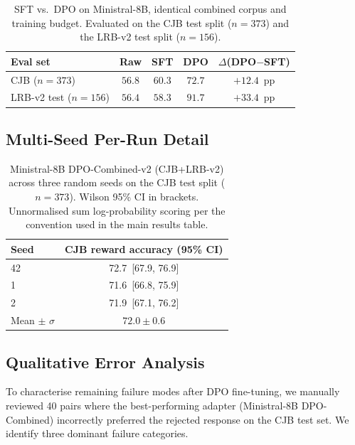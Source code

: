 \documentclass{article}
\theoremstyle{plain}
\theoremstyle{definition}
\theoremstyle{remark}
\begin{document}
\begin{table}[h]
\centering
\caption{SFT vs.\ DPO on Ministral-8B, identical combined corpus and training budget.  Evaluated on the CJB test split ($n=373$) and the LRB-v2 test split ($n=156$).}
\label{tab:sft-ablation}
\smallskip
\small
\setlength{\tabcolsep}{3pt}
\begin{tabular}{lcccc}
\toprule
\textbf{Eval set} & \textbf{Raw} & \textbf{SFT} & \textbf{DPO} & \textbf{$\Delta$(DPO$-$SFT)} \\
\midrule
CJB ($n=373$)           & $56.8$ & $60.3$ & $\mathbf{72.7}$ & $+12.4$~pp \\
LRB-v2 test ($n=156$)   & $56.4$ & $58.3$ & $\mathbf{91.7}$ & $+33.4$~pp \\
\bottomrule
\end{tabular}
\end{table}

\subsection{Multi-Seed Per-Run Detail}
\label{app:multiseed}

\begin{table}[h]
\centering
\caption{Ministral-8B DPO-Combined-v2 (CJB+LRB-v2) across three random seeds on the CJB test split ($n=373$).  Wilson 95\% CI in brackets.  Unnormalised sum log-probability scoring per the convention used in the main results table.}
\label{app:tab:multiseed}
\smallskip
\small
\setlength{\tabcolsep}{6pt}
\begin{tabular}{lc}
\toprule
\textbf{Seed} & \textbf{CJB reward accuracy (95\% CI)} \\
\midrule
42 & 72.7 \,[67.9, 76.9] \\
1  & 71.6 \,[66.8, 75.9] \\
2  & 71.9 \,[67.1, 76.2] \\
\midrule
Mean $\pm$ $\sigma$ & $\mathbf{72.0 \pm 0.6}$ \\
\bottomrule
\end{tabular}
\end{table}

\subsection{Qualitative Error Analysis}
\label{app:errors}

To characterise remaining failure modes after DPO fine-tuning, we manually reviewed 40 pairs where the best-performing adapter (Ministral-8B DPO-Combined) incorrectly preferred the rejected response on the CJB test set.  We identify three dominant failure categories.
\end{document}
